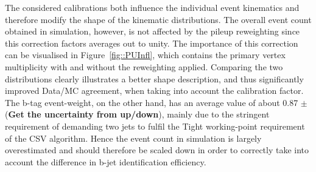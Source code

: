 The considered calibrations both influence the individual event kinematics and therefore modify the shape of the kinematic distributions.
The overall event count obtained in simulation, however, is not affected by the pileup reweighting since this correction factors averages out to unity.
The importance of this correction can be visualised in Figure~\ref{fig::PUInfl}, which contains the primary vertex multiplicity with and without the reweighting applied.
Comparing the two distributions clearly illustrates a better shape description, and thus significantly improved Data/MC agreement, when taking into account the calibration factor.
\\
The b-tag event-weight, on the other hand, has an average value of about 0.87 $\pm$  (\textbf{Get the uncertainty from up/down}), mainly due to the stringent requirement of demanding two jets to fulfil the Tight working-point requirement of the CSV algorithm.
Hence the event count in simulation is largely overestimated and should therefore be scaled down in order to correctly take into account the difference in b-jet identification efficiency.
%
%


